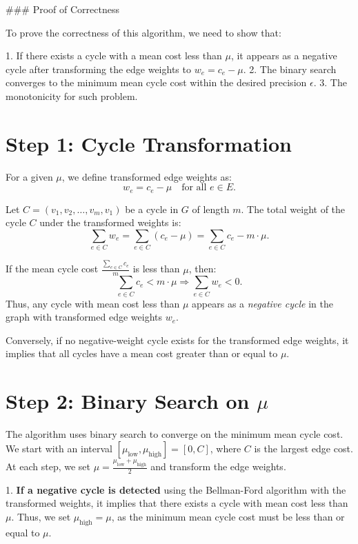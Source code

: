### Proof of Correctness

To prove the correctness of this algorithm, we need to show that:

1. If there exists a cycle with a mean cost less than \( \mu \), it appears as a negative cycle after transforming the edge weights to \( w_e = c_e - \mu \).
2. The binary search converges to the minimum mean cycle cost within the desired precision \( \epsilon \).
3. The monotonicity for such problem.
\section*{Step 1: Cycle Transformation}

For a given \( \mu \), we define transformed edge weights as:
\[
w_e = c_e - \mu \quad \text{for all } e \in E.
\]

Let \( C = (v_1, v_2, \dots, v_m, v_1) \) be a cycle in \( G \) of length \( m \). The total weight of the cycle \( C \) under the transformed weights is:
\[
\sum_{e \in C} w_e = \sum_{e \in C} (c_e - \mu) = \sum_{e \in C} c_e - m \cdot \mu.
\]

If the mean cycle cost \( \frac{\sum_{e \in C} c_e}{m} \) is less than \( \mu \), then:
\[
\sum_{e \in C} c_e < m \cdot \mu \Rightarrow \sum_{e \in C} w_e < 0.
\]
Thus, any cycle with mean cost less than \( \mu \) appears as a \emph{negative cycle} in the graph with transformed edge weights \( w_e \).

Conversely, if no negative-weight cycle exists for the transformed edge weights, it implies that all cycles have a mean cost greater than or equal to \( \mu \).

\section*{Step 2: Binary Search on \( \mu \)}

The algorithm uses binary search to converge on the minimum mean cycle cost. We start with an interval \( [\mu_{\text{low}}, \mu_{\text{high}}] = [0, C] \), where \( C \) is the largest edge cost. At each step, we set \( \mu = \frac{\mu_{\text{low}} + \mu_{\text{high}}}{2} \) and transform the edge weights.

1. \textbf{If a negative cycle is detected} using the Bellman-Ford algorithm with the transformed weights, it implies that there exists a cycle with mean cost less than \( \mu \). Thus, we set \( \mu_{\text{high}} = \mu \), as the minimum mean cycle cost must be less than or equal to \( \mu \).

